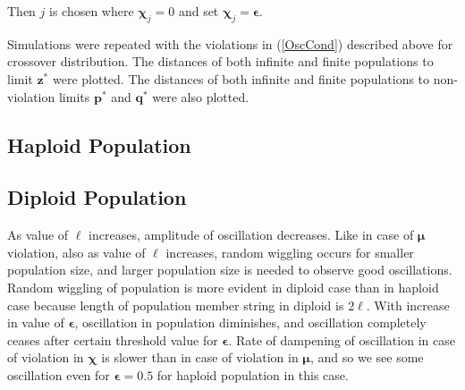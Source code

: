 Then $j$ is chosen where $\bm{\chi}_j = 0$ and set $\bm{\chi}_j = \bm{\epsilon}$. 

Simulations were repeated with the violations in (\ref{OscCond}) described above for crossover distribution.
The distances of both infinite and finite populations to limit $\bm{z}^\ast$ were plotted. 
The distances of both infinite and finite populations to non-violation limits $\bm{p}^\ast$ and $\bm{q}^\ast$ were also plotted.

\subsection{Haploid Population}



 
\subsection{Diploid Population}




As value of $\ell$ increases, amplitude of oscillation decreases. 
Like in case of $\bm{\mu}$ violation, also as value of $\ell$ increases, random wiggling occurs for smaller population size, 
and larger population size is needed to observe good oscillations. Random wiggling of 
population is more evident in diploid case than in haploid case because length of 
population member string in diploid is $2\ell$. With increase in value of $\bm{\epsilon}$, 
oscillation in population diminishes, and oscillation completely ceases after certain threshold value for $\bm{\epsilon}$. 
Rate of dampening of oscillation in case of violation in $\bm{\chi}$ is slower than in case of violation in ${\bm{\mu}}$, 
and so we see some oscillation even for $\bm{\epsilon} = 0.5$ for haploid population in this case. 


